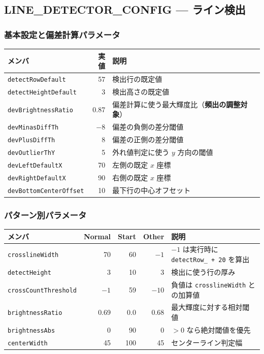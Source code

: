 \documentclass[a4paper,11pt,dvipdfmx]{jsarticle}
\begin{document}
\subsection{LINE\_DETECTOR\_CONFIG --- ライン検出}\label{sec:params-line}

\subsubsection{基本設定と偏差計算パラメータ}

\begin{tabularx}{\textwidth}{l r X}
\toprule
\textbf{メンバ} & \textbf{実値} & \textbf{説明} \\
\midrule
\texttt{detectRowDefault}      & 57    & 検出行の既定値 \\
\texttt{detectHeightDefault}   & 3     & 検出高さの既定値 \\
\texttt{devBrightnessRatio}    & 0.87  & 偏差計算に使う最大輝度比（\textbf{頻出の調整対象}） \\
\texttt{devMinasDiffTh}        & $-8$  & 偏差の負側の差分閾値 \\
\texttt{devPlusDiffTh}         & 8     & 偏差の正側の差分閾値 \\
\texttt{devOutlierThY}         & 5     & 外れ値判定に使う $y$ 方向の閾値 \\
\texttt{devLeftDefaultX}       & 70    & 左側の既定 $x$ 座標 \\
\texttt{devRightDefaultX}      & 90    & 右側の既定 $x$ 座標 \\
\texttt{devBottomCenterOffset} & 10    & 最下行の中心オフセット \\
\bottomrule
\end{tabularx}

\subsubsection{パターン別パラメータ}

\begin{tabularx}{\textwidth}{l r r r X}
\toprule
\textbf{メンバ} & \textbf{Normal} & \textbf{Start} & \textbf{Other} & \textbf{説明} \\
\midrule
\texttt{crosslineWidth}      & 70   & 60   & $-1$  & $-1$ は実行時に \texttt{detectRow\_ + 20} を算出 \\
\texttt{detectHeight}        & 3    & 10   & 3     & 検出に使う行の厚み \\
\texttt{crossCountThreshold} & $-1$ & 59   & $-10$ & 負値は \texttt{crosslineWidth} との加算値 \\
\texttt{brightnessRatio}     & 0.69 & 0.0  & 0.68  & 最大輝度に対する相対閾値 \\
\texttt{brightnessAbs}       & 0    & 90   & 0     & $>0$ なら絶対閾値を優先 \\
\texttt{centerWidth}         & 45   & 100  & 45    & センターライン判定幅 \\
\bottomrule
\end{tabularx}
\end{document}
